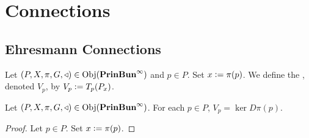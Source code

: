 \documentclass{book}
\begin{document}
	
	\newpage
	\chapter{Connections}
	
	\section{Ehresmann Connections}
	
	\begin{defn}
		Let $(P, X, \pi, G, \triangleleft) \in \operatorname{Obj}(\operatorname*{\text{\textbf{PrinBun}}^{\infty}})$ and $p \in P$. Set $x \vcentcolon= \pi(p)$. We define the , denoted $V_p$, by $V_p \vcentcolon= T_p(P_x)$. 
	\end{defn}
	
	\begin{ex}
		Let $(P, X, \pi, G, \triangleleft) \in \operatorname{Obj}(\operatorname*{\text{\textbf{PrinBun}}^{\infty}})$. For each $p \in P$, $V_p = \ker D \pi(p)$.
	\end{ex}

	\begin{proof}
		Let $p \in P$. Set $x \vcentcolon= \pi(p)$. 
	\end{proof}
	
	
	
	
	
	
	
	
	
	
	
	
	
	
	
	
	
	
	
	
	
	
	
	
	
	
	
	
	
	
	
	
	
	
	
	
	
	
	
	
	
	
	
	
	
	
	
	
	
	
	
	
	
	
	
	
	
	
	
	
	
\end{document}
